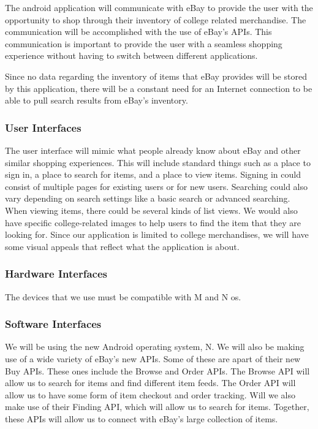 \documentclass[journal,compsoc, 10pt, draftclsnofoot, onecolumn]{IEEEtran}
\begin{document}
The android application will communicate with eBay to provide the user with the 
opportunity to shop through their inventory of college related merchandise. The 
communication will be accomplished with the use of eBay's APIs. This 
communication is important to provide the user with a seamless shopping 
experience without having to switch between different applications.\newline

Since no data regarding the inventory of items that eBay provides will be stored
 by this application, there will be a constant need for an Internet connection 
to be able to pull search results from eBay's inventory. 

\subsubsection{User Interfaces}

The user interface will mimic what people already know about eBay and other 
similar shopping experiences. This will include standard things such as a place 
to sign in, a place to search for items, and a place to view items. Signing in 
could consist of multiple pages for existing users or for new users. Searching 
could also vary depending on search settings like a basic search or advanced 
searching. When viewing items, there could be several kinds of list views. We 
would also have specific college-related images to help users to find the item 
that they are looking for. Since our application is limited to college 
merchandises, we will have some visual appeals that reflect what the application
 is about.

\subsubsection{Hardware Interfaces}

The devices that we use must be compatible with M and N os. 

\subsubsection{Software Interfaces}

We will be using the new Android operating system, N. We will also be making use
 of a wide variety of eBay's new APIs. Some of these are apart of their new Buy 
APIs. These ones include the Browse and Order APIs. The Browse API will allow us
 to search for items and find different item feeds. The Order API will allow us 
to have some form of item checkout and order tracking. Will we also make use of 
their Finding API, which will allow us to search for items. Together, these APIs
 will allow us to connect with eBay's large collection of items.
\end{document}
